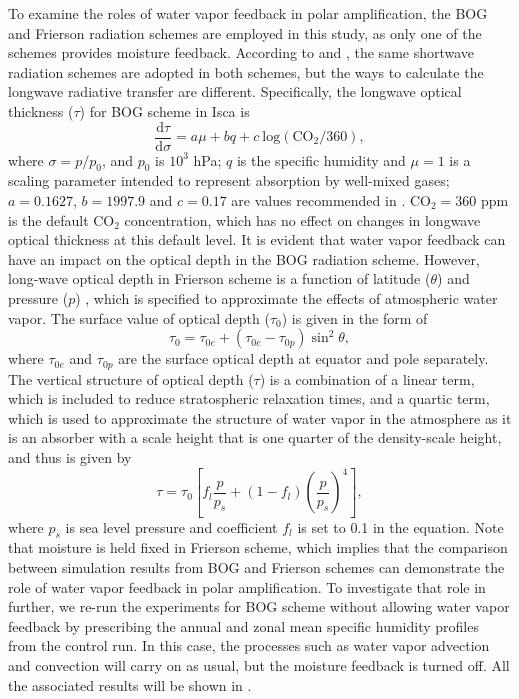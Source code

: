 To examine the roles of water vapor feedback in polar amplification, the BOG and Frierson radiation schemes are employed in this study, as only one of the schemes provides moisture feedback. According to \cite{Byrne2013} and \cite{Frierson2006}, the same shortwave radiation schemes are adopted in both schemes, but the ways to calculate the longwave radiative transfer are different. Specifically, the longwave optical thickness ($\tau$) for BOG scheme in Isca is
\begin{equation}\label{eq:bog_tau}
    \frac{\text{d}\tau}{\text{d}\sigma}=a\mu+bq+c~\text{log}(\text{CO}_2/360),
\end{equation}
where $\sigma = p/p_0$, and $p_0$ is $10^3$ hPa; $q$ is the specific humidity and $\mu=1$ is a scaling parameter intended to represent absorption by well-mixed gases; $a=0.1627$, $b=1997.9$ and $c=0.17$ are values recommended in \cite{Vallis2018}. CO$_2=360$ ppm is the default CO$_2$ concentration, which has no effect on changes in longwave optical thickness at this default level. It is evident that water vapor feedback can have an impact on the optical depth in the BOG radiation scheme. However, long-wave optical depth in Frierson scheme is a function of latitude ($\theta$) and pressure ($p$) \citep{Frierson2006}, which is specified to approximate the effects of atmospheric water vapor. The surface value of optical depth ($\tau_0$) is given in the form of
\begin{equation}\label{eq:frierson_lw_optical_depth1}
\tau_0 = \tau_{0e}+(\tau_{0e}-\tau_{0p})\operatorname{sin}^2\theta,
\end{equation}
where $\tau_{0e}$ and $\tau_{0p}$ are the surface optical depth at equator and pole separately. The vertical structure of optical depth ($\tau$) is a combination of a linear term, which is included to reduce stratospheric relaxation times, and a quartic term, which is used to approximate the structure of water vapor in the atmosphere as it is an absorber with a scale height that is one quarter of the density-scale height, and thus is given by
\begin{equation}\label{eq:frierson_lw_optical_depth2}
\tau=\tau_0\left[f_l\frac{p}{p_s}+(1-f_l)\left(\frac{p}{p_s}\right)^4\right],
\end{equation}
where $p_s$ is sea level pressure and coefficient $f_l$ is set to 0.1 in the equation. Note that moisture is held fixed in Frierson scheme, which implies that the comparison between simulation results from BOG and Frierson schemes can demonstrate the role of water vapor feedback in polar amplification. To investigate that role in further, we re-run the experiments for BOG scheme without allowing water vapor feedback by prescribing the annual and zonal mean specific humidity profiles from the control run. In this case, the processes such as water vapor advection and convection will carry on as usual, but the moisture feedback is turned off. All the associated results will be shown in .

